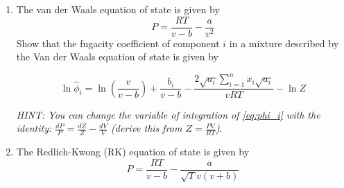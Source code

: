 \documentclass[12pt, A4paper]{article}
\begin{document}
\begin{enumerate}
\item 
The van der Waals equation of state is given by
\begin{equation}
P = \frac{RT}{v - b} - \frac{a}{v^2}
\end{equation}
 Show that the fugacity coefficient of component $i$ in a mixture described by the Van der Waals equation of state is given by
  
\begin{equation}
\ln{\hat{\phi}_i} = \ln{\left(\frac{v}{v - b} \right)}+ \frac{b_i}{v - b} - \frac{2 \sqrt{a_i} \sum_{i = 1}^n x_i \sqrt{a_i} }{v R T} - \ln{Z}
\end{equation}
 
  \textit{HINT: You can change the variable of integration of \autoref{eq:phi_i} with the identity:  $\frac{dP}{P} = \frac{dZ}{Z} - \frac{dV}{V}$  (derive this from $Z = \frac{PV}{RT}$)}.
  
  
   
   
\begin{flushright} 
\end{flushright}

 

\item
 The Redlich-Kwong (RK) equation of state is given by
\begin{equation}  \label{eq:RK}
 P = \frac{RT}{v - b} - \frac{a}{\sqrt{T} v \left(v + b \right)}
\end{equation}


\end{enumerate}
\end{document}
